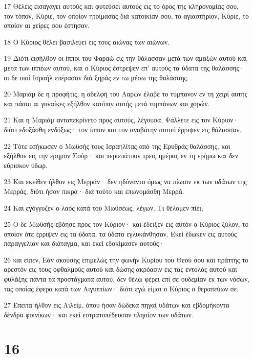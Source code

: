 \par 17 Θέλεις εισαγάγει αυτούς και φυτεύσει αυτούς εις το όρος της κληρονομίας σου, τον τόπον, Κύριε, τον οποίον ητοίμασας διά κατοικίαν σου, το αγιαστήριον, Κύριε, το οποίον αι χείρες σου έστησαν.
\par 18 Ο Κύριος θέλει βασιλεύει εις τους αιώνας των αιώνων.
\par 19 Διότι εισήλθον οι ίπποι του Φαραώ εις την θάλασσαν μετά των αμαξών αυτού και μετά των ιππέων αυτού, και ο Κύριος έστρεψεν επ' αυτούς τα ύδατα της θαλάσσης· οι δε υιοί Ισραήλ επέρασαν διά ξηράς εν τω μέσω της θαλάσσης.
\par 20 Μαριάμ δε η προφήτις, η αδελφή του Ααρών έλαβε το τύμπανον εν τη χειρί αυτής και πάσαι αι γυναίκες εξήλθον κατόπιν αυτής μετά τυμπάνων και χορών.
\par 21 Και η Μαριάμ ανταπεκρίνετο προς αυτούς, λέγουσα, Ψάλλετε εις τον Κύριον· διότι εδοξάσθη ενδόξως· τον ίππον και τον αναβάτην αυτού έρριψεν εις θάλασσαν.
\par 22 Τότε εσήκωσεν ο Μωϋσής τους Ισραηλίτας από της Ερυθράς θαλάσσης, και εξήλθον εις την έρημον Σούρ· και περιεπάτουν τρεις ημέρας εν τη ερήμω και δεν εύρισκον ύδωρ.
\par 23 Και εκείθεν ήλθον εις Μερράν· δεν ηδύναντο όμως να πίωσιν εκ των υδάτων της Μερράς, διότι ήσαν πικρά· διά τούτο και επωνομάσθη Μερρά.
\par 24 Και εγόγγυζεν ο λαός κατά του Μωϋσέως, λέγων, Τι θέλομεν πίει;
\par 25 Ο δε Μωϋσής εβόησε προς τον Κύριον· και έδειξεν εις αυτόν ο Κύριος ξύλον, το οποίον ότε έρριψεν εις τα ύδατα, τα ύδατα εγλυκάνθησαν. Εκεί έδωκεν εις αυτούς παραγγελίαν και διάταγμα, και εκεί εδοκίμασεν αυτούς·
\par 26 και είπεν, Εάν ακούσης επιμελώς την φωνήν Κυρίου του Θεού σου και πράττης το αρεστόν εις τους οφθαλμούς αυτού και δώσης ακρόασιν εις τας εντολάς αυτού και φυλάξης πάντα τα προστάγματα αυτού, δεν θέλω φέρει επί σε ουδεμίαν εκ των νόσων, τας οποίας έφερα κατά των Αιγυπτίων· διότι εγώ είμαι ο Κύριος ο θεραπεύων σε.
\par 27 Έπειτα ήλθον εις Αιλείμ, όπου ήσαν δώδεκα πηγαί υδάτων και εβδομήκοντα δένδρα φοινίκων· και εκεί εστρατοπέδευσαν πλησίον των υδάτων.

\chapter{16}

